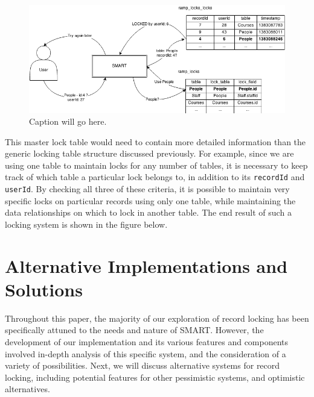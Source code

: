 \documentclass[12pt]{article}
\newcommand{\code}[1]{\texttt{#1}}
\begin{document}
\begin{center}
\begin{figure}[h]
    \centering
    \centerline{\includegraphics[width=7in]{diagrams/UnifiedLockDesign.png}}
    \begin{spacing}{1.0}\caption{Caption will go here.}\end{spacing}
\end{figure}
\end{center}

This master lock table would need to contain more detailed information than the generic locking table structure discussed previously. For example, since we are using one table to maintain locks for any number of tables, it is necessary to keep track of which table a particular lock belongs to, in addition to its \code{recordId} and \code{userId}. By checking all three of these criteria, it is possible to maintain very specific locks on particular records using only one table, while maintaining the data relationships on which to lock in another table. The end result of such a locking system is shown in the figure below.

\newpage
\section{Alternative Implementations and Solutions}

Throughout this paper, the majority of our exploration of record locking has been specifically attuned to the needs and nature of SMART. However, the development of our implementation and its various features and components involved in-depth analysis of this specific system, and the consideration of a variety of possibilities. Next, we will discuss alternative systems for record locking, including potential features for other pessimistic systems, and optimistic alternatives.
\end{document}
